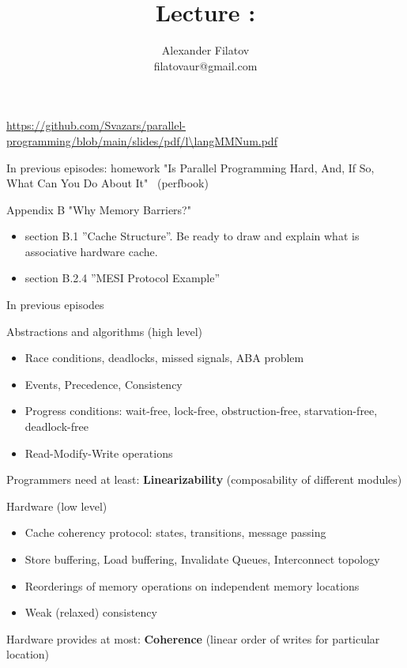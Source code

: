 


\newcommand{\thisLectureNum}{\langMMNum}


\title[]{Lecture \thisLectureNum: \langMMTopic}
\subtitle[]{\langMMKey}
\author[]{Alexander Filatov\\ filatovaur@gmail.com}

\date{}



\begin{frame}
  \titlepage
  \url{https://github.com/Svazars/parallel-programming/blob/main/slides/pdf/l\thisLectureNum.pdf}
\end{frame}


\begin{frame}{In previous episodes: homework}
"Is Parallel Programming Hard, And, If So, What Can You Do About It" \ (perfbook) 

Appendix B "Why Memory Barriers?"

\begin{itemize}
    \item section B.1 ''Cache Structure''. Be ready to draw and explain what is associative hardware cache.
    \item section B.2.4 ''MESI Protocol Example''
\end{itemize}
\end{frame}

\begin{frame}{In previous episodes}

Abstractions and algorithms (high level)
\begin{itemize} 
 \item Race conditions, deadlocks, missed signals, ABA problem
 \item Events, Precedence, Consistency
 \item Progress conditions: wait-free, lock-free, obstruction-free, starvation-free, deadlock-free 
 \item Read-Modify-Write operations
\end{itemize}

Programmers need at least: \textbf{Linearizability} (composability of different modules)

Hardware (low level)
\begin{itemize}    
    \item Cache coherency protocol: states, transitions, message passing
    \item Store buffering, Load buffering, Invalidate Queues, Interconnect topology
    \item Reorderings of memory operations on independent memory locations
    \item Weak (relaxed) consistency
\end{itemize}

Hardware provides at most: \textbf{Coherence} (linear order of writes for particular location)

\end{frame}


